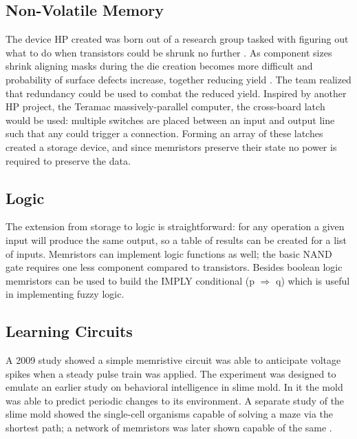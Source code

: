 \documentclass[12pt]{article}
\begin{document}
\subsection{Non-Volatile Memory}\label{memory}
The device HP created was born out of a research group tasked with figuring out
what to do when transistors could be shrunk no further \cite{williams2008we}.
As component sizes shrink aligning masks during the die creation becomes more
difficult and probability of surface defects increase, together reducing yield
\cite{snider2008molecular}.  The team realized that redundancy could be used to
combat the reduced yield.  Inspired by another HP project, the Teramac
\cite{heath1998} massively-parallel computer, the cross-board latch would be
used: multiple switches are placed between an input and output line such that
any could trigger a connection.  Forming an array of these latches created a
storage device, and since memristors preserve their state no power is required
to preserve the data.

\subsection{Logic}\label{logic}
The extension from storage to logic is straightforward: for any operation a
given input will produce the same output, so a table of results can be created
for a list of inputs.  Memristors can implement logic functions as well; the
basic NAND gate requires one less component compared to transistors.  Besides
boolean logic memristors can be used to build the IMPLY conditional (p
$\Rightarrow $ q) \cite{DBLP:journals/corr/abs-1110-2074} which is useful in implementing fuzzy logic.

\subsection{Learning Circuits}\label{ai}
A 2009 study\cite{pershin2009} showed a simple memristive circuit was able to
anticipate voltage spikes when a steady pulse train was applied.  The
experiment was designed to emulate an earlier study \cite{saigusa2008} on
behavioral intelligence in slime mold.  In it the mold was able to predict
periodic changes to its environment.  A separate study
\cite{nakagaki2000intelligence} of the slime mold showed the single-cell
organisms capable of solving a maze via the shortest path; a network of memristors was later shown capable of the same \cite{pershin2011}.


\newpage{}



\end{document}
